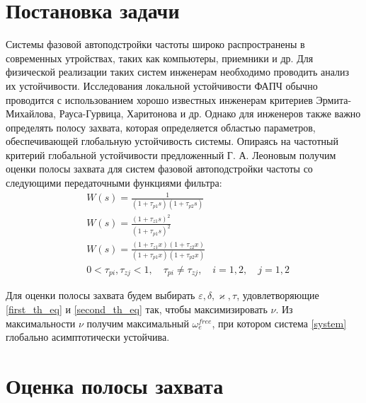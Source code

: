 \documentclass[a4paper,article,14pt]{extarticle}
\begin{document}

\newpage
\section{Постановка задачи}
Системы фазовой автоподстройки частоты широко распространены в современных утройствах, таких как компьютеры, приемники и др. Для физической реализации таких систем инженерам необходимо проводить анализ их устойчивости. Исследования локальной устойчивости ФАПЧ обычно проводится с использованием хорошо известных инженерам критериев Эрмита-Михайлова, Рауса-Гурвица, Харитонова и др. Однако для инженеров также важно определять полосу захвата, которая определяется областью параметров, обеспечивающей глобальную устойчивость системы. Опираясь на частотный критерий глобальной устойчивости предложенный Г. А. Леоновым получим оценки полосы захвата для систем фазовой автоподстройки частоты со следующими передаточными функциями фильтра: 
 \begin{align}
&W(s) = \frac{1}{(1+\tau_{p1}s)(1+\tau_{p2}s)}\\[5pt]
&W(s) = \frac{(1+\tau_{z1}s)^2}{(1+\tau_{p1}s)^2}\\[5pt]
&W(s) = \frac{(1+\tau_{z1}x)(1+\tau_{z2}x)}{(1+\tau_{p1}x)(1+\tau_{p2}x)}\\
&0<\tau_{pi},\tau_{zj} < 1, \quad \tau_{pi} \neq \tau_{zj}, \quad i=1,2, \quad j=1,2
 \end{align}
 
 Для оценки полосы захвата будем выбирать $\varepsilon, \delta, \varkappa, \tau$, удовлетворяющие \eqref{first_th_eq} и \eqref{second_th_eq} так, чтобы максимизировать $\nu$. Из максимальности $\nu$ получим максимальный $\omega_e^{free}$, при котором система \eqref{system} глобально асимптотически устойчива.
 

\pagebreak
\section{Оценка полосы захвата}
\end{document}

